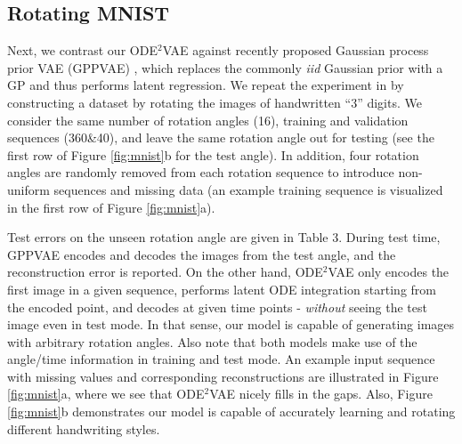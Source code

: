 \documentclass{article}
\newcommand{\0}{\mathbf{0}}
\begin{document}
\subsection{Rotating MNIST}
Next, we contrast our ODE$^2$VAE against recently proposed Gaussian process prior VAE (GPPVAE) \citep{casale2018gaussian}, which replaces the commonly \textit{iid} Gaussian prior with a GP and thus performs latent regression. We repeat the experiment in \cite{casale2018gaussian} by constructing a dataset by rotating the images of handwritten ``3'' digits. 
We consider the same number of rotation angles (16), training and validation sequences (360\&40), and leave the same rotation angle out for testing (see the first row of Figure \ref{fig:mnist}b for the test angle). 
In addition, four rotation angles are randomly removed from each rotation sequence to introduce non-uniform sequences and missing data (an example training sequence is visualized in the first row of Figure \ref{fig:mnist}a). 


Test errors on the unseen rotation angle are given in Table 3. 
During test time, GPPVAE encodes and decodes the images from the test angle, and the reconstruction error is reported. On the other hand, ODE$^2$VAE only encodes the first image in a given sequence, performs latent ODE integration starting from the encoded point, and decodes at given time points - \textit{without} seeing the test image even in test mode. In that sense, our model is capable of generating images with arbitrary rotation angles. Also note that both models make use of the angle/time information in training and test mode. An example input sequence with missing values and corresponding reconstructions are illustrated in Figure \ref{fig:mnist}a, where we see that ODE$^2$VAE nicely fills in the gaps. Also, Figure \ref{fig:mnist}b demonstrates our model is capable of accurately learning and rotating different handwriting styles.\\
\end{document}
